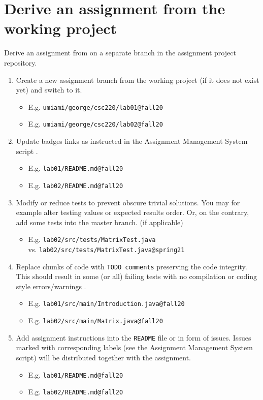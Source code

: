 \section{Derive an assignment from the working project} \label{ssec:deriveassn}

{Derive an assignment from on a separate branch in the assignment project repository.}

\begin{enumerate}
\item
 {Create a new assignment branch from the working project (if it does not exist yet) and switch to it.}
    \begin{itemize}
    \item
      {E.g. \texttt{umiami/george/csc220/lab01@fall20}}
    \item
      {E.g. \texttt{umiami/george/csc220/lab02@fall20}}
    \end{itemize}

\item
  {Update badges links as instructed in the Assignment Management System script .}
    \begin{itemize}
    \item
      {E.g. \texttt{lab01/README.md@fall20}}
    \item
      {E.g. \texttt{lab02/README.md@fall20}}
    \end{itemize}

\item
  {Modify or reduce tests to prevent obscure trivial solutions. You may for example alter testing values or expected results order. Or, on the contrary, add some tests into the master branch. (if applicable)}
    \begin{itemize}
    \item
      {E.g. \texttt{lab02/src/tests/MatrixTest.java} \\ vs. \texttt{lab02/src/tests/MatrixTest.java@spring21}}
    \end{itemize}

\item
  {Replace chunks of code with \texttt{TODO comments} preserving the code integrity. This should result in some (or all) failing tests with no compilation or coding style errors/warnings .}
    \begin{itemize}
    \item
      {E.g. \texttt{lab01/src/main/Introduction.java@fall20}}
    \item
      {E.g. \texttt{lab02/src/main/Matrix.java@fall20}}
    \end{itemize}

\item
  {Add assignment instructions into the \texttt{README} file or in form of issues. Issues marked with corresponding labels (see the Assignment Management System script) will be distributed together with the assignment.}
    \begin{itemize}
    \item
      {E.g. \texttt{lab01/README.md@fall20}}
    \item
      {E.g. \texttt{lab02/README.md@fall20}}
    \end{itemize}
\end{enumerate}

